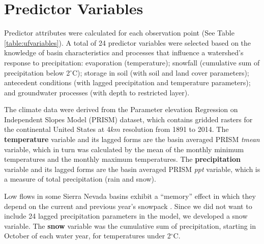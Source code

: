 
\section*{Predictor Variables}

Predictor attributes were calculated for each observation point (See Table \ref{table:ufvariables}). A total of 24 predictor variables were selected based on the knowledge of basin characteristics and processes that influence a watershed's response to precipitation: evaporation (temperature); snowfall (cumulative sum of precipitation below 2$^{\circ}$C); storage in soil (with soil and land cover parameters); antecedent conditions (with lagged precipitation and temperature parameters); and groundwater processes (with depth to restricted layer). 

The climate data were derived from the Parameter elevation Regression on Independent Slopes Model (PRISM) dataset, which contains gridded rasters for the continental United States at 4$km$ resolution from 1891 to 2014. The \textbf{temperature} variable and its lagged forms are the basin averaged PRISM \textit{tmean} variable, which in turn was calculated by the mean of the monthly minimum temperatures and the monthly maximum temperatures. The \textbf{precipitation} variable and its lagged forms are the basin averaged PRISM \textit{ppt} variable, which is a measure of total precipitation (rain and snow). 

Low flows in some Sierra Nevada basins exhibit a ``memory'' effect in which they depend on the current and previous year's snowpack \cite{godsey2014effects}. Since we did not want to include 24 lagged precipitation parameters in the model, we developed a snow variable. The \textbf{snow} variable was the cumulative sum of precipitation, starting in October of each water year, for temperatures under 2$^{\circ}$C. 

